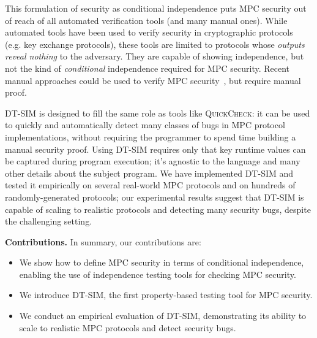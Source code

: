 \documentclass[compsoc, conference, a4paper, 10pt, times]{IEEEtran}
\renewcommand{\paragraph}[1]{\vspace*{2pt}\noindent\textbf{#1}}
\newcommand{\toolname}{\textsc{DT-SIM}\xspace}
\begin{document}
This formulation of security as conditional independence puts MPC security out of reach of all automated verification tools (and many manual ones). While automated tools have been used to verify security in cryptographic protocols~\cite{gancher2023owl, barthe2019probabilistic, darais2019language, fournet2011information}  (e.g. key exchange protocols), these tools are limited to protocols whose \emph{outputs reveal nothing} to the adversary. They are capable of showing independence, but not the kind of \emph{conditional} independence required for MPC security. Recent manual approaches could be used to verify MPC security~\cite{li2023lilac, gancher2023core, haagh2018computer}, but require manual proof.

\toolname is designed to fill the same role as tools like \textsc{QuickCheck}: it can be used to quickly and automatically detect many classes of bugs in MPC protocol implementations, without requiring the programmer to spend time building a manual security proof.
Using \toolname requires only that key runtime values can be captured during program execution;
it's agnostic to the language and many other details about the subject program.
We have implemented \toolname and tested it empirically on several real-world MPC protocols and on hundreds of randomly-generated protocols; our experimental results suggest that \toolname is capable of scaling to realistic protocols and detecting many security bugs, despite the challenging setting.


\paragraph{Contributions.}
In summary, our contributions are:
%
\begin{itemize}
\item We show how to define MPC security in terms of conditional independence, enabling the use of independence testing tools for checking MPC security.
\item We introduce \toolname, the first property-based testing tool for MPC security.
\item We conduct an empirical evaluation of \toolname, demonstrating its ability to scale to realistic MPC protocols and detect security bugs.
\end{itemize}
  
\end{document}
